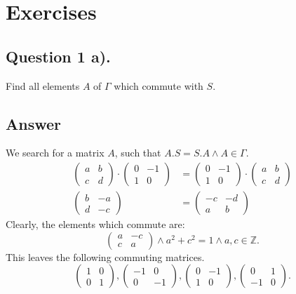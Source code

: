 \section{Exercises}


\subsection{Question 1 a).}
\noindent
Find all elements $A$ of $\Gamma$ which commute with $S$.

\subsection*{Answer}
\noindent
We search for a matrix $A$, such that $A.S = S.A \wedge A \in \Gamma$.
\begin{align*}
    \begin{pmatrix}
        a & b\\
        c & d
    \end{pmatrix} \cdot
    \begin{pmatrix}
        0 & -1\\
        1 & 0
    \end{pmatrix}
    &=
    \begin{pmatrix}
        0 & -1\\
        1 & 0
    \end{pmatrix} \cdot
    \begin{pmatrix}
        a & b\\
        c & d
    \end{pmatrix} \\
    \begin{pmatrix}
        b & -a\\
        d & -c
    \end{pmatrix}
    &=
    \begin{pmatrix}
        -c & -d\\
        a & b
    \end{pmatrix}
\end{align*}
Clearly, the elements which commute are:
\[
    \begin{pmatrix}
        a & -c\\
        c & a
    \end{pmatrix}
    \wedge a^2 + c^2 = 1 \wedge a,c \in \mathbb{Z}.
\]
This leaves the following commuting matrices.
\[
    \begin{pmatrix}
        1 & 0\\
        0 & 1
    \end{pmatrix},
    \begin{pmatrix}
        -1 & 0\\
        0 & -1
    \end{pmatrix},
    \begin{pmatrix}
        0 & -1\\
        1 & 0
    \end{pmatrix},
    \begin{pmatrix}
        0 & 1\\
        -1 & 0
    \end{pmatrix}.
\]




